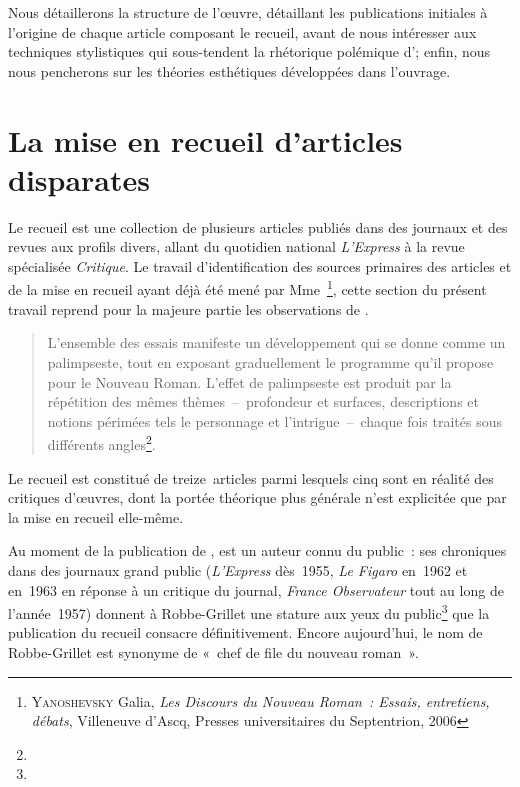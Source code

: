 Nous détaillerons la structure de l'œuvre, détaillant les publications initiales à l'origine de chaque article composant le recueil, avant de nous intéresser aux techniques stylistiques qui sous-tendent la rhétorique polémique d'\robbe ; enfin, nous nous pencherons sur les théories esthétiques développées dans l'ouvrage.

\newpage

\section{La mise en recueil d'articles disparates}


Le recueil \punr{} est une collection de plusieurs articles publiés dans des journaux et des revues aux profils divers, allant du quotidien national \textit{L'Express} à la revue spécialisée \textit{Critique}. Le travail d'identification des sources primaires des articles et de la mise en recueil ayant déjà été mené par Mme~\galia\footnote{\textsc{Yanoshevsky} Galia, \textit{Les Discours du Nouveau Roman~: Essais, entretiens, débats}, Villeneuve d'Ascq, Presses universitaires du Septentrion, 2006}, cette section du présent travail reprend pour la majeure partie les observations de \galia.
\begin{quote}
    L’ensemble des essais manifeste un développement qui se donne comme un palimpseste, tout en exposant graduellement le programme qu’il propose pour le Nouveau Roman. L’effet de palimpseste est produit par la répétition des mêmes thèmes~–~profondeur et surfaces, descriptions et notions périmées tels le personnage et l’intrigue~–~chaque fois traités sous différents angles\footnote{}.
\end{quote}
Le recueil est constitué de treize~articles parmi lesquels cinq sont en réalité des critiques d'œuvres, dont la portée théorique plus générale n'est explicitée que par la mise en recueil elle-même.

Au moment de la publication de \punr, \robbe{} est un auteur connu du public~: ses chroniques dans des journaux grand public (\textit{L'Express} dès~1955, \textit{Le Figaro} en~1962 et en~1963 en réponse à un critique du journal, \textit{France Observateur} tout au long de l'année~1957) donnent à Robbe-Grillet une stature aux yeux du public\footnote{} que la publication du recueil consacre définitivement. Encore aujourd'hui, le nom de Robbe-Grillet est synonyme de «~chef de file du nouveau roman~».

